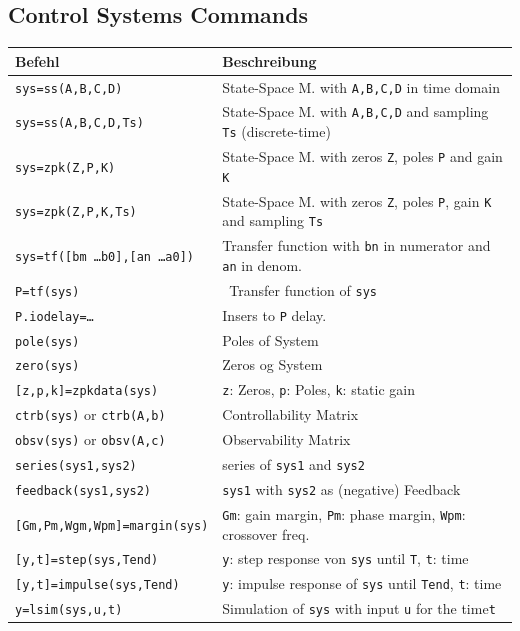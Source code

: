 \documentclass[a4paper,12 pt]{article}
\numberwithin{equation}{section}
\theoremstyle{definition}
\theoremstyle{remark}
\theoremstyle{definition}
\theoremstyle{definition}
\theoremstyle{definition}
\theoremstyle{remark}
\begin{document}
\subsection{Control Systems Commands}
\begin{center}
\begin{tabular}{ll}
\toprule
Befehl & Beschreibung \\
\midrule
\texttt{sys=ss(A,B,C,D)} & State-Space M. with \texttt{A,B,C,D} in time domain \\
\texttt{sys=ss(A,B,C,D,Ts)} & State-Space M. with \texttt{A,B,C,D} and sampling \texttt{Ts} (discrete-time) \\
\texttt{sys=zpk(Z,P,K)} & State-Space M. with zeros \texttt{Z}, poles \texttt{P} and gain \texttt{K} \\
\texttt{sys=zpk(Z,P,K,Ts)} & State-Space M. with zeros \texttt{Z}, poles \texttt{P}, gain \texttt{K} and sampling \texttt{Ts} \\
\texttt{sys=tf([bm \ldots b0],[an \ldots a0])} & Transfer function with  \texttt{bn} in numerator and \texttt{an} in denom. \\
\texttt{P=tf(sys)} & \ Transfer function of \texttt{sys} \\
\texttt{P.iodelay=\dots} & Insers to \texttt{P} delay.\\
\texttt{pole(sys)} & Poles of System \\
\texttt{zero(sys)} &  Zeros og System \\
\texttt{[z,p,k]=zpkdata(sys)} & \texttt{z}: Zeros, \texttt{p}: Poles, \texttt{k}: static gain\\
\texttt{ctrb(sys)} or \texttt{ctrb(A,b)} & Controllability Matrix \\
\texttt{obsv(sys)} or \texttt{obsv(A,c)} & Observability Matrix \\
\texttt{series(sys1,sys2)} & series of \texttt{sys1} and \texttt{sys2} \\
\texttt{feedback(sys1,sys2)} & \texttt{sys1} with  \texttt{sys2} as (negative) Feedback \\
\texttt{[Gm,Pm,Wgm,Wpm]=margin(sys)} &
\texttt{Gm}: gain margin, \texttt{Pm}: phase margin, \texttt{Wpm}: crossover freq. \\
\texttt{[y,t]=step(sys,Tend)} & \texttt{y}: step response von \texttt{sys} until \texttt{T}, \texttt{t}: time\\
\texttt{[y,t]=impulse(sys,Tend)} & \texttt{y}: impulse response of \texttt{sys} until \texttt{Tend}, \texttt{t}: time\\
\texttt{y=lsim(sys,u,t)} & Simulation of \texttt{sys} with input \texttt{u} for the time\texttt{t} \\

\end{tabular}
\end{center}
\end{document}
